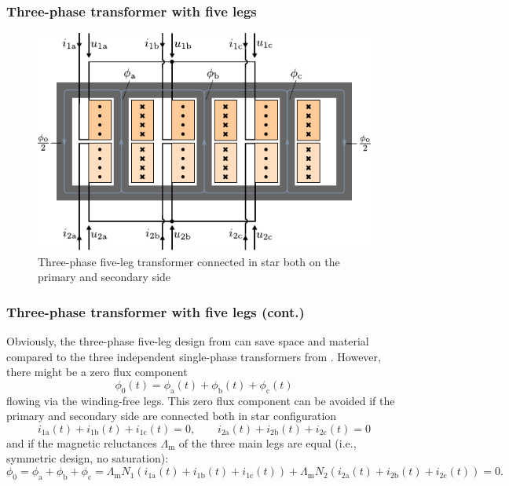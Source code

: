 \begin{frame}
	\frametitle{Three-phase transformer with five legs}
	\begin{figure}
		\includegraphics[height=0.75\textheight]{fig/lec04/Three_phase_transformer_5_legs.pdf}
		\caption{Three-phase five-leg transformer connected in star both on the primary and secondary side}
		\label{fig:Three_phase_transformer_5_legs}
	\end{figure}
\end{frame}


\begin{frame}
	\frametitle{Three-phase transformer with five legs (cont.)}
	Obviously, the three-phase five-leg design from  can save space and material compared to the three independent single-phase transformers from . However, there might be a zero flux component
	\begin{equation}
		\phi_0(t) = \phi_\mathrm{a}(t) + \phi_\mathrm{b}(t) + \phi_\mathrm{c}(t)  
	\end{equation} 
	flowing via the winding-free legs. \pause This zero flux component can be avoided if the primary and secondary side are connected both in star configuration
	$$ i_{1\mathrm{a}}(t)+i_{1\mathrm{b}}(t)+i_{1\mathrm{c}}(t)=0, \qquad i_{2\mathrm{a}}(t)+i_{2\mathrm{b}}(t)+i_{2\mathrm{c}}(t)=0$$
	\pause
	and if the magnetic reluctances $\Lambda_\mathrm{m}$ of the three main legs are equal (i.e., symmetric design, no saturation):
	\begin{equation*}
		\phi_0 = \phi_\mathrm{a} + \phi_\mathrm{b} + \phi_\mathrm{c} = \Lambda_\mathrm{m} N_1 \left(i_{1\mathrm{a}}(t)+i_{1\mathrm{b}}(t)+i_{1\mathrm{c}}(t)\right)+\Lambda_\mathrm{m} N_2 \left(i_{2\mathrm{a}}(t)+i_{2\mathrm{b}}(t)+i_{2\mathrm{c}}(t)\right) = 0.
	\end{equation*}
\end{frame}

